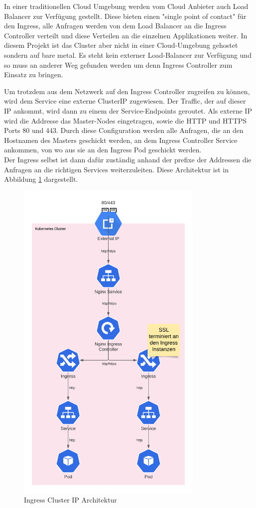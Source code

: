 In einer traditionellen Cloud Umgebung werden vom Cloud Anbieter auch Load Balancer zur Verfügung gestellt. 
Diese bieten einen "single point of contact" für den Ingress, alle Anfragen werden von dem Load Balancer an die Ingress Controller verteilt und diese Verteilen an die einzelnen Applikationen weiter.
In diesem Projekt ist das Cluster aber nicht in einer Cloud-Umgebung gehostet sondern auf bare metal.
Es steht kein externer Load-Balancer zur Verfügung und so muss an anderer Weg gefunden werden um denn Ingress Controller zum Einsatz zu bringen. 

Um trotzdem aus dem Netzwerk auf den Ingress Controller zugreifen zu können, wird dem Service eine externe ClusterIP zugewiesen.
Der Traffic, der auf dieser \ac{IP} ankommt, wird dann zu einem der Service-Endpoints geroutet.
Als externe \ac{IP} wird die Addresse das Master-Nodes eingetragen, sowie die \ac{HTTP} und \ac{HTTPS} Ports 80 und 443.
Durch diese Configuration werden alle Anfragen, die an den Hostnamen des Masters geschickt werden, an dem Ingress Controller Service ankommen, von wo aus sie an den Ingress Pod geschickt werden.
\\
Der Ingress selbst ist dann dafür zuständig anhand der prefixe der Addressen die Anfragen an die richtigen Services weiterzuleiten.
Diese Architektur ist in Abbildung \ref{fig:clusterip} dargestellt.
\begin{figure}[h!]
    \centering
    \includegraphics[width=0.8\textwidth]{bilder/ClusterIP.png}
    \caption{Ingress Cluster IP Architektur}
    \label{fig:clusterip}
\end{figure}
